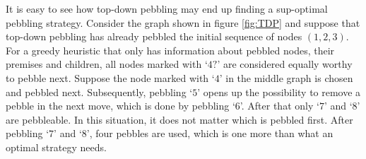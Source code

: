 \documentclass{llncs}
\begin{document}
\begin{example}
\label{example:TDP}
It is easy to see how top-down pebbling may end up finding a sup-optimal pebbling strategy. Consider the graph shown in figure \ref{fig:TDP} and suppose that top-down pebbling has already pebbled the initial sequence of nodes $(1,2,3)$. 
For a greedy heuristic that only has information about pebbled nodes, their premises and children, all nodes marked with `$4?$' are considered equally worthy to pebble next.
Suppose the node marked with `$4$' in the middle graph is chosen and pebbled next.
Subsequently, pebbling `$5$' opens up the possibility to remove a pebble in the next move, which is done by pebbling `$6$'.
After that only `$7$' and `$8$' are pebbleable. In this situation, it does not matter which is pebbled first.
After pebbling `$7$' and `$8$', four pebbles are used, which is one more than what an optimal strategy needs.



\end{example}
\end{document}
